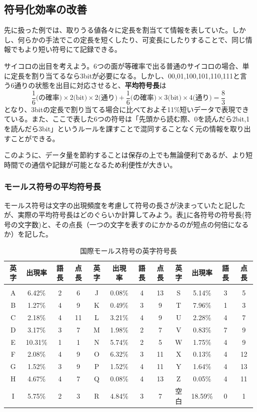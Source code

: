 \subsection{符号化効率の改善}
先に扱った例では、取りうる値各々に定長を割当てて情報を表していた。しかし、何らかの手法でこの定長を短くしたり、可変長にしたりすることで、同じ情報でもより短い符号にて記録できる。

サイコロの出目を考えよう。6つの面が等確率で出る普通のサイコロの場合、単に定長を割り当てるなら3bitが必要になる。しかし、00,01,100,101,110,111と言う6通りの状態を出目に対応させると、\textbf{平均符号長}は
\[\frac{1}{6}\text{(の確率)}\times 2\text{(bit)} \times 2\text{(通り)}+\frac{1}{6}\text{(の確率)}\times 3\text{(bit)} \times 4\text{(通り)}=\frac{8}{3}\]
となり、3bitの定長で割り当てる場合に比べておよそ11\%短いデータで表現できている。また、ここで表した6つの符号は「先頭から読む際、0を読んだら2bit,1を読んだら3bit」というルールを課すことで混同することなく元の情報を取り出すことができる。

このように、データ量を節約することは保存の上でも無論便利であるが、より短時間での通信や記録が可能となるため利便性が大きい。

\subsubsection{モールス符号の平均符号長}
モールス符号は文字の出現頻度を考慮して符号の長さが決まっていたと記したが、実際の平均符号長はどのぐらいか計算してみよう。表\ref{table1_4}に各符号の符号長(符号の文字数)と、その点長（一つの文字を表すのにかかるのが短点の何倍になるか）を記した。

\begin{table}[htbp]
\centering
\caption{国際モールス符号の英字符号長}\label{table1_4}
\begin{tabular}{|c|c|c|c||c|c|c|c||c|c|c|c|}\hline
英字&出現率&語長&点長&英字&出現率&語長&点長&英字&出現率&語長&点長\\ \hline
&&&&&&&&&&& \\[-15pt] \hline
A&6.42\%&2&6&J&0.08\%&4&13&S&5.14\%&3&5\\ \hline
B&1.27\%&4&9&K&0.49\%&3&9&T&7.96\%&1&3\\ \hline
C&2.18\%&4&11&L&3.21\%&4&9&U&2.28\%&4&7\\ \hline
D&3.17\%&3&7&M&1.98\%&2&7&V&0.83\%&7&9\\ \hline
E&10.31\%&1&1&N&5.74\%&2&5&W&1.75\%&4&9\\ \hline
F&2.08\%&4&9&O&6.32\%&3&11&X&0.13\%&4&12\\ \hline
G&1.52\%&3&9&P&1.52\%&4&11&Y&1.64\%&4&13\\ \hline
H&4.67\%&4&7&Q&0.08\%&4&13&Z&0.05\%&4&11\\ \hline
I&5.75\%&2&3&R&4.84\%&3&7&空白&18.59\%&0&1\\ \hline
\end{tabular}
\end{table}

